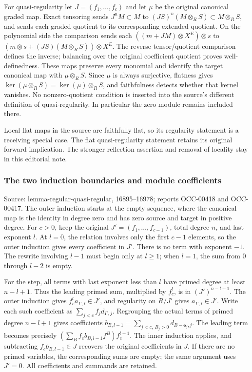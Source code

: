 For quasi-regularity let \(J=(f_1,\ldots,f_c)\) and let \(\mu\) be the original canonical graded map. Exact tensoring sends \(J^nM\subset M\) to \((JS)^n(M\otimes_RS)\subset M\otimes_RS\), and sends each graded quotient to its corresponding extended quotient. On the polynomial side the comparison sends each \(((m+JM)\otimes X^E)\otimes s\) to \((m\otimes s+(JS)(M\otimes_RS))\otimes X^E\). The reverse tensor/quotient comparison defines the inverse; balancing over the original coefficient quotient proves well-definedness. These maps preserve every monomial and identify the target canonical map with \(\mu\otimes_RS\). Since \(\mu\) is always surjective, flatness gives \(\ker(\mu\otimes_RS)=\ker(\mu)\otimes_RS\), and faithfulness detects whether that kernel vanishes. No nonzero-quotient condition is inserted into the source's different definition of quasi-regularity. In particular the zero module remains included there.

Local flat maps in the source are faithfully flat, so its regularity statement is a receiving special case. The flat quasi-regularity statement retains its original forward implication. The stronger reflection assertion and removal of locality stay in this editorial note.

\subsubsection{The two induction boundaries and module coefficients}\label{the-two-induction-boundaries-and-module-coefficients}

Source: lemma-regular-quasi-regular, 16895--16978; reports OCC-00418 and OCC-00417. The outer induction starts at the empty sequence, where the canonical map is the identity in degree zero and has zero source and target in positive degree. For \(c>0\), keep the original \(J'=(f_1,\ldots,f_{c-1})\), total degree \(n\), and last exponent \(l\). At \(l=0\), the relation involves only the first \(c-1\) elements, so the outer induction gives every coefficient in \(J'\). There is no term with exponent \(-1\). The rewrite involving \(l-1\) must begin only at \(l\geq1\); when \(l=1\), the sum from 0 through \(l-2\) is empty.

For the step, all terms with last exponent less than \(l\) have primed degree at least \(n-l+1\). Thus the leading primed sum, multiplied by \(f_c^l\), is in \((J')^{n-l+1}\). The outer induction gives \(f_c^l a_{I',l}\in J'\), and regularity on \(R/J'\) gives \(a_{I',l}\in J'\). Write each such coefficient as \(\sum_{j<c}f_jd_{I',j}\). Regrouping the actual terms of primed degree \(n-l+1\) gives coefficients \(b_{B,l-1}=\sum_{j<c,\ B_j>0}d_{B-\mathbf e_j,j}\). The leading term becomes precisely \((\sum_B f_cb_{B,l-1}f^B)f_c^{l-1}\). The inner induction applies, and subtracting \(f_cb_{B,l-1}\in J\) recovers the original coefficients in \(J\). If there are no primed variables, the corresponding sums are empty; the same argument uses \(J'=0\). All coefficients and summands are retained.

